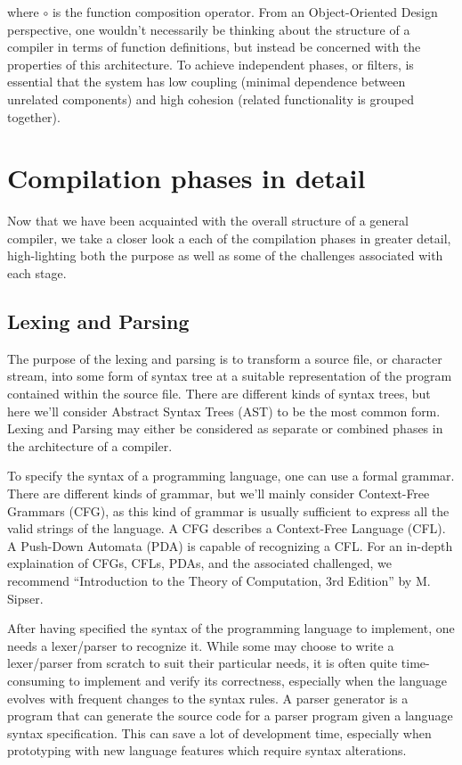 where $\circ$ is the function composition operator. From an Object-Oriented Design perspective, one wouldn't necessarily be thinking about the structure
of a compiler in terms of function definitions, but instead be concerned with the properties of this architecture. To achieve independent phases, or filters,
is essential that the system has low coupling (minimal dependence between unrelated components) and high cohesion (related functionality is grouped together).

\section{Compilation phases in detail}

Now that we have been acquainted with the overall structure of a general compiler, we take a closer look a each of the compilation phases in greater detail,
high-lighting both the purpose as well as some of the challenges associated with each stage.

\subsection{Lexing and Parsing}

The purpose of the lexing and parsing is to transform a source file, or character stream, into some form of syntax tree at a suitable representation of
the program contained within the source file. There are different kinds of syntax trees, but here we'll consider Abstract Syntax Trees (AST) to be the
most common form. Lexing and Parsing may either be considered as separate or combined phases in the architecture of a compiler.

To specify the syntax of a programming language, one can use a formal grammar. There are different kinds of grammar, but we'll mainly consider Context-Free
Grammars (CFG), as this kind of grammar is usually sufficient to express all the valid strings of the language. A CFG describes a Context-Free Language (CFL).
A Push-Down Automata (PDA) is capable of recognizing a CFL. For an in-depth explaination of CFGs, CFLs, PDAs, and the associated challenged, we
recommend ``Introduction to the Theory of Computation, 3rd Edition'' by M. Sipser.

After having specified the syntax of the programming language to implement, one needs a lexer/parser to recognize it. While some may choose to write a lexer/parser
from scratch to suit their particular needs, it is often quite time-consuming to implement and verify its correctness, especially when the language evolves with
frequent changes to the syntax rules. A parser generator is a program that can generate the source code for a parser program given a language syntax specification.
This can save a lot of development time, especially when prototyping with new language features which require syntax alterations.

